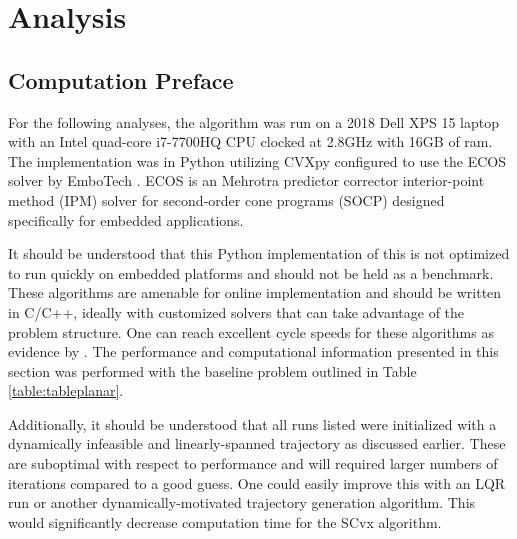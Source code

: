 \chapter{Analysis}
\label{analysis}

\section{Computation Preface}

For the following analyses, the algorithm was run on a 2018 Dell XPS 15 laptop with an Intel quad-core i7-7700HQ CPU clocked at 2.8GHz with 16GB of ram. The implementation was in Python utilizing CVXpy configured to use the ECOS solver by EmboTech \cite{domahidi2013ecos}. ECOS is an Mehrotra predictor corrector interior-point method (IPM) solver for second-order cone programs (SOCP) designed specifically for embedded applications.

It should be understood that this Python implementation of this is not optimized to run quickly on embedded platforms and should not be held as a benchmark. These algorithms are amenable for online implementation and should be written in C/C++, ideally with customized solvers that can take advantage of the problem structure. One can reach excellent cycle speeds for these algorithms as evidence by \cite{szmuk2019successive}. The performance and computational information presented in this section was performed with the baseline problem outlined in Table \ref{table:tableplanar}.

Additionally, it should be understood that all runs listed were initialized with a dynamically infeasible and linearly-spanned trajectory as discussed earlier. These are suboptimal with respect to performance and will required larger numbers of iterations compared to a good guess. One could easily improve this with an LQR run or another dynamically-motivated trajectory generation algorithm. This would significantly decrease computation time for the SCvx algorithm.

